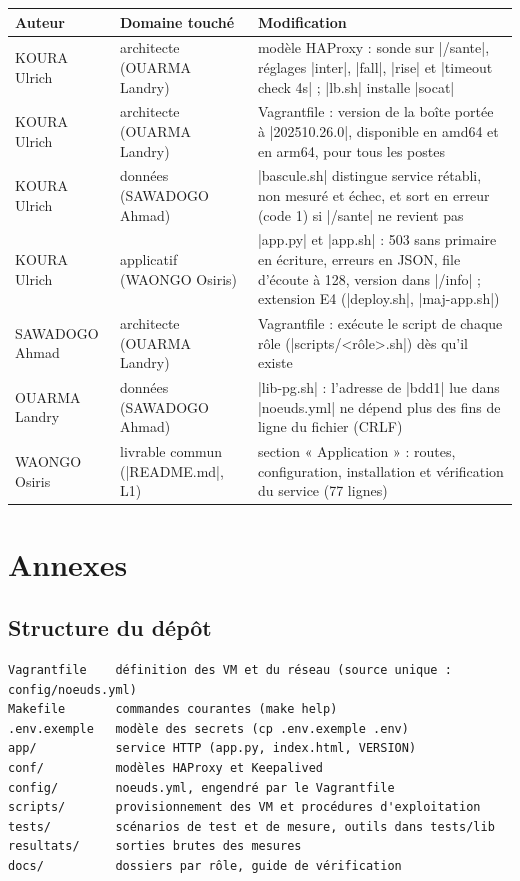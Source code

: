 \documentclass[a4paper,11pt]{article}
\begin{document}
{\small
\begin{longtable}{@{}L{2.8cm}L{3.8cm}L{8.4cm}@{}}
\toprule
\textbf{Auteur} & \textbf{Domaine touché} & \textbf{Modification}\\
\midrule\endhead
KOURA Ulrich & architecte (OUARMA Landry) & modèle HAProxy : sonde sur |/sante|, réglages |inter|, |fall|, |rise| et |timeout check 4s| ; |lb.sh| installe |socat|\\
KOURA Ulrich & architecte (OUARMA Landry) & Vagrantfile : version de la boîte portée à |202510.26.0|, disponible en amd64 et en arm64, pour tous les postes\\
KOURA Ulrich & données (SAWADOGO Ahmad) & |bascule.sh| distingue service rétabli, non mesuré et échec, et sort en erreur (code 1) si |/sante| ne revient pas\\
KOURA Ulrich & applicatif (WAONGO Osiris) & |app.py| et |app.sh| : 503 sans primaire en écriture, erreurs en JSON, file d'écoute à 128, version dans |/info| ; extension E4 (|deploy.sh|, |maj-app.sh|)\\
SAWADOGO Ahmad & architecte (OUARMA Landry) & Vagrantfile : exécute le script de chaque rôle (|scripts/<rôle>.sh|) dès qu'il existe\\
OUARMA Landry & données (SAWADOGO Ahmad) & |lib-pg.sh| : l'adresse de |bdd1| lue dans |noeuds.yml| ne dépend plus des fins de ligne du fichier (CRLF)\\
WAONGO Osiris & livrable commun (|README.md|, L1) & section « Application » : routes, configuration, installation et vérification du service (77 lignes)\\
\bottomrule
\end{longtable}}

\clearpage
\appendix
\section{Annexes}

\subsection{Structure du dépôt}
\begin{lstlisting}
Vagrantfile    définition des VM et du réseau (source unique : config/noeuds.yml)
Makefile       commandes courantes (make help)
.env.exemple   modèle des secrets (cp .env.exemple .env)
app/           service HTTP (app.py, index.html, VERSION)
conf/          modèles HAProxy et Keepalived
config/        noeuds.yml, engendré par le Vagrantfile
scripts/       provisionnement des VM et procédures d'exploitation
tests/         scénarios de test et de mesure, outils dans tests/lib
resultats/     sorties brutes des mesures
docs/          dossiers par rôle, guide de vérification
\end{lstlisting}
\end{document}
